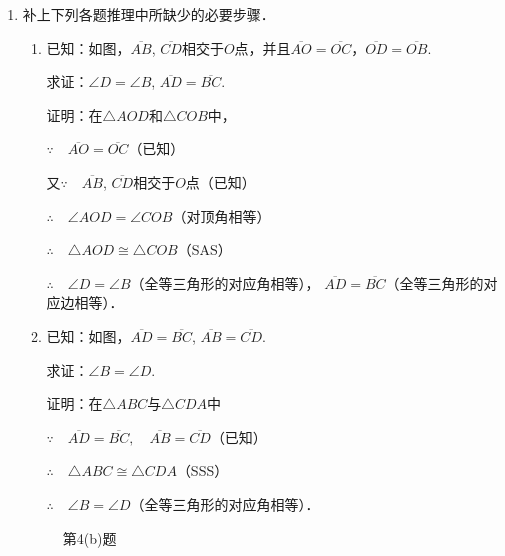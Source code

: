 \begin{enumerate}
\item 补上下列各题推理中所缺少的必要步骤．
\begin{enumerate}
	\item 已知：如图，$\overline{AB}$, $\overline{CD}$相交于$O$点，并且$\overline{AO}=\overline{OC}$，$\overline{OD}=\overline{OB}$.

求证：$\angle D=\angle B$, $\overline{AD}=\overline{BC}$.

证明：在$\triangle AOD$和$\triangle COB$中，

$\because\quad \overline{AO}=\overline{OC}$（已知）

又$\because\quad \overline{AB}$, $\overline{CD}$相交于$O$点（已知）

$\therefore\quad \angle AOD=\angle COB$（对顶角相等）

$\therefore\quad \triangle AOD\cong \triangle COB$（SAS）

$\therefore\quad \angle D=\angle B$（全等三角形的对应角相等），
$\overline{AD}=\overline{BC}$（全等三角形的对应边相等）．

\item 已知：如图，$\overline{AD}=\overline{BC}$, $\overline{AB}=\overline{CD}$.

求证：$\angle B=\angle D$.

证明：在$\triangle ABC$与$\triangle CDA$中

$\because\quad \overline{AD}=\overline{BC},\quad \overline{AB}=\overline{CD}$（已知）

$\therefore\quad \triangle ABC\cong\triangle CDA$（SSS）

$\therefore\quad \angle B=\angle D$（全等三角形的对应角相等）．


\end{enumerate}

\begin{figure}[htp]\centering
    \begin{minipage}[t]{0.48\textwidth}
    \centering
{}
    \caption*{第4(b)题}
    \end{minipage}
    \begin{minipage}[t]{0.48\textwidth}
    \centering
\end{minipage}
\end{figure}
\end{enumerate}
